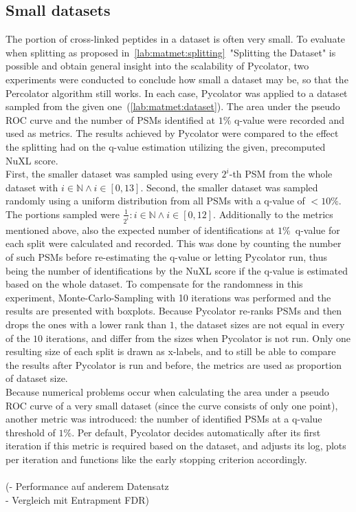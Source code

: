 \subsection{Small datasets}
\label{lab:matmet:small_datasets}
The portion of cross-linked peptides in a dataset is often very small. To evaluate when splitting as proposed in~\ref{lab:matmet:splitting}~"Splitting the Dataset" is possible and obtain general insight into the scalability of Pycolator, two experiments were conducted to conclude how small a dataset may be, so that the Percolator algorithm still works. In each case, Pycolator was applied to a dataset sampled from the given one~(\ref{lab:matmet:dataset}). The area under the pseudo ROC curve and the number of PSMs identified at $1\%$ q-value were recorded and used as metrics. The results achieved by Pycolator were compared to the effect the splitting had on the q-value estimation utilizing the given, precomputed NuXL score.\\
First, the smaller dataset was sampled using every $2^i$-th PSM from the whole dataset with $i\in\mathbb{N} \land i\in[0,13]$. Second, the smaller dataset was sampled randomly using a uniform distribution from all PSMs with a q-value of $<10\%$. The portions sampled were $\frac{1}{2^i} : i\in\mathbb{N} \land i\in[0,12]$. Additionally to the metrics mentioned above, also the expected number of identifications at $1\%$~q-value for each split were calculated and recorded. This was done by counting the number of such PSMs before re-estimating the q-value or letting Pycolator run, thus being the number of identifications by the NuXL score if the q-value is estimated based on the whole dataset.
To compensate for the randomness in this experiment, Monte-Carlo-Sampling with 10 iterations was performed and the results are presented with boxplots. Because Pycolator re-ranks PSMs and then drops the ones with a lower rank than $1$, the dataset sizes are not equal in every of the $10$ iterations, and differ from the sizes when Pycolator is not run. Only one resulting size of each split is drawn as x-labels, and to still be able to compare the results after Pycolator is run and before, the metrics are used as proportion of dataset size.\\
Because numerical problems occur when calculating the area under a pseudo ROC curve of a very small dataset (since the curve consists of only one point), another metric was introduced: the number of identified PSMs at a q-value threshold of $1\%$. Per default, Pycolator decides automatically after its first iteration if this metric is required based on the dataset, and adjusts its log, plots per iteration and functions like the early stopping criterion accordingly.\\\\
(- Performance auf anderem Datensatz\\
- Vergleich mit Entrapment FDR)
